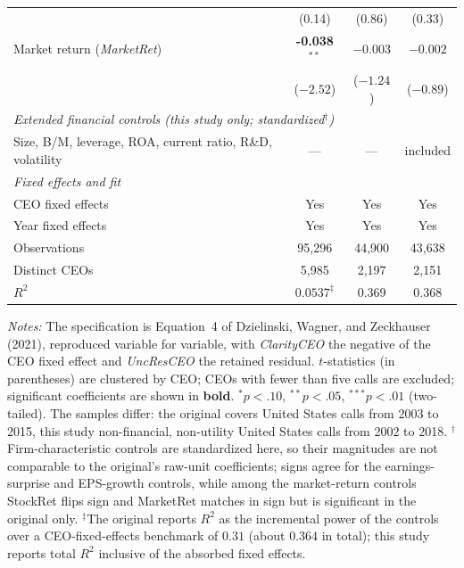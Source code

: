 \begin{table}[htbp]
\begin{tabular}{lccc}
 & (0.14) & (0.86) & (0.33) \\
Market return (\textit{MarketRet}) & \textbf{-0.038}$^{**}$ & $-0.003$ & $-0.002$ \\
 & ($-2.52$) & ($-1.24$) & ($-0.89$) \\
\midrule
\multicolumn{4}{l}{\textit{Extended financial controls (this study only; standardized$^{\dagger}$)}} \\
\midrule
Size, B/M, leverage, ROA, current ratio, R\&D, volatility & --- & --- & included \\
\midrule
\multicolumn{4}{l}{\textit{Fixed effects and fit}} \\
\midrule
CEO fixed effects & Yes & Yes & Yes \\
Year fixed effects & Yes & Yes & Yes \\
Observations & 95,296 & 44,900 & 43,638 \\
Distinct CEOs & 5,985 & 2,197 & 2,151 \\
$R^2$ & $0.0537^{\ddagger}$ & 0.369 & 0.368 \\
\bottomrule
\end{tabular}
\begin{minipage}{0.96\linewidth}
\vspace{8pt}\footnotesize
\textit{Notes:} The specification is Equation~4 of Dzielinski, Wagner, and Zeckhauser (2021), reproduced variable for variable, with \textit{ClarityCEO} the negative of the CEO fixed effect and \textit{UncResCEO} the retained residual. $t$-statistics (in parentheses) are clustered by CEO; CEOs with fewer than five calls are excluded; significant coefficients are shown in \textbf{bold}. $^{*}p<.10$, $^{**}p<.05$, $^{***}p<.01$ (two-tailed). The samples differ: the original covers United States calls from 2003 to 2015, this study non-financial, non-utility United States calls from 2002 to 2018. $^{\dagger}$Firm-characteristic controls are standardized here, so their magnitudes are not comparable to the original's raw-unit coefficients; signs agree for the earnings-surprise and EPS-growth controls, while among the market-return controls StockRet flips sign and MarketRet matches in sign but is significant in the original only. $^{\ddagger}$The original reports $R^2$ as the incremental power of the controls over a CEO-fixed-effects benchmark of $0.31$ (about $0.364$ in total); this study reports total $R^2$ inclusive of the absorbed fixed effects.
\end{minipage}
\end{table}
